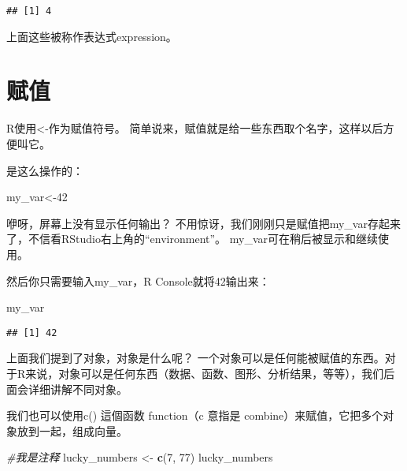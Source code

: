\documentclass[]{book}
\newenvironment{Shaded}{\begin{snugshade}}{\end{snugshade}}
\newcommand{\CommentTok}[1]{\textcolor[rgb]{0.56,0.35,0.01}{\textit{#1}}}
\newcommand{\DecValTok}[1]{\textcolor[rgb]{0.00,0.00,0.81}{#1}}
\newcommand{\KeywordTok}[1]{\textcolor[rgb]{0.13,0.29,0.53}{\textbf{#1}}}
\newcommand{\NormalTok}[1]{#1}
\newcommand{\OperatorTok}[1]{\textcolor[rgb]{0.81,0.36,0.00}{\textbf{#1}}}
\newcommand{\StringTok}[1]{\textcolor[rgb]{0.31,0.60,0.02}{#1}}
\begin{document}
\begin{Shaded}
\end{Shaded}

\begin{verbatim}
## [1] 4
\end{verbatim}

上面这些被称作表达式expression。

\section{赋值}

R使用\textless{}-作为赋值符号。
简单说来，赋值就是给一些东西取个名字，这样以后方便叫它。

是这么操作的：

\begin{Shaded}
\begin{Highlighting}[]
\NormalTok{my_var<-}\DecValTok{42}
\end{Highlighting}
\end{Shaded}

咿呀，屏幕上没有显示任何输出？
不用惊讶，我们刚刚只是赋值把my\_var存起来了，不信看RStudio右上角的``environment''。
my\_var可在稍后被显示和继续使用。

然后你只需要输入my\_var，R Console就将42输出来：

\begin{Shaded}
\begin{Highlighting}[]
\NormalTok{my_var}
\end{Highlighting}
\end{Shaded}

\begin{verbatim}
## [1] 42
\end{verbatim}

上面我们提到了对象，对象是什么呢？
一个对象可以是任何能被赋值的东西。对于R来说，对象可以是任何东西（数据、函数、图形、分析结果，等等），我们后面会详细讲解不同对象。

我们也可以使用c() 這個函数 function（c 意指是
combine）来赋值，它把多个对象放到一起，组成向量。

\begin{Shaded}
\begin{Highlighting}[]
\CommentTok{#我是注释}
\NormalTok{lucky_numbers <-}\StringTok{ }\KeywordTok{c}\NormalTok{(}\DecValTok{7}\NormalTok{, }\DecValTok{77}\NormalTok{)}
\NormalTok{lucky_numbers}
\end{Highlighting}
\end{Shaded}
\end{document}
